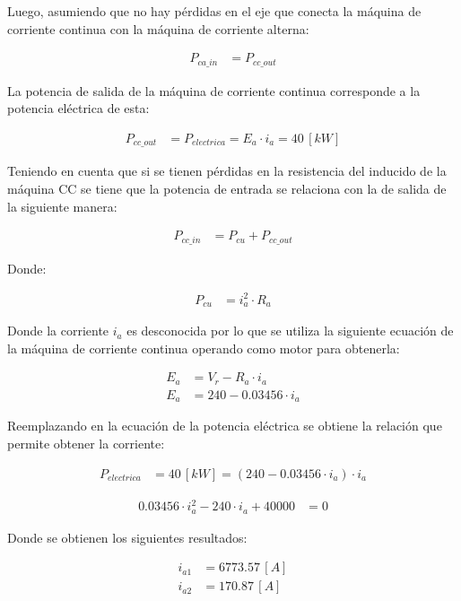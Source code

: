 \documentclass[
  11pt,
  letterpaper,
   addpoints,
   answers
  ]{exam}
\begin{document}
\begin{questions}
\begin{solution}
    Luego, asumiendo que no hay pérdidas en el eje que conecta la máquina de corriente continua con la máquina de corriente alterna:
    
    \begin{align}
    P_{ca\_in} &= P_{cc\_out}
    \end{align}
    
    La potencia de salida de la máquina de corriente continua corresponde a la potencia eléctrica de esta:
    
    \begin{align}
    P_{cc\_out} &= P_{electrica} = E_a \cdot i_a = 40 \, [kW]
    \end{align}
    
    Teniendo en cuenta que si se tienen pérdidas en la resistencia del inducido de la máquina CC se tiene que la potencia de entrada se relaciona con la de salida de la siguiente manera:
    
    \begin{align}
    P_{cc\_in} &= P_{cu} + P_{cc\_out}
    \end{align}
    
    Donde:
    
    \begin{align}
    P_{cu} &= i_a^2 \cdot R_a
    \end{align}
    
    Donde la corriente \( i_a \) es desconocida por lo que se utiliza la siguiente ecuación de la máquina de corriente continua operando como motor para obtenerla:
    
    \begin{align}
    E_a &= V_r - R_a \cdot i_a \\
    E_a &= 240 - 0.03456 \cdot i_a
    \end{align}
    
    Reemplazando en la ecuación de la potencia eléctrica se obtiene la relación que permite obtener la corriente:
    
    \begin{align}
    P_{electrica} &= 40 \, [kW] = (240 - 0.03456 \cdot i_a) \cdot i_a
    \end{align}
    
    \begin{align}
    0.03456 \cdot i_a^2 - 240 \cdot i_a + 40000 &= 0
    \end{align}
    
    Donde se obtienen los siguientes resultados:
    
    \begin{align}
    i_{a1} &= 6773.57 \, [A] \\
    i_{a2} &= 170.87 \, [A]
    \end{align}
    

\end{solution}
\end{questions}
\end{document}
